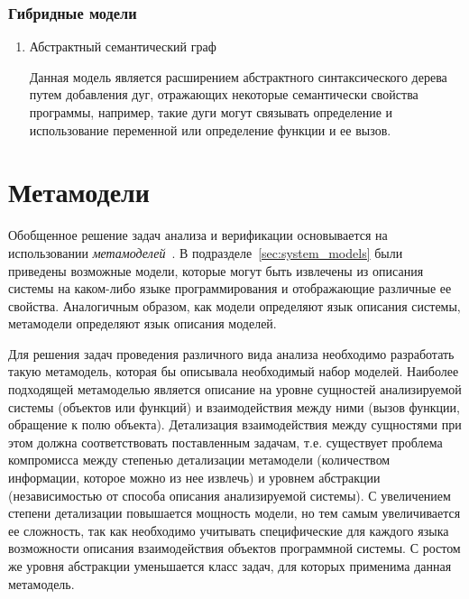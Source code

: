 \subsubsection{Гибридные модели}
\begin{enumerate}
    \item Абстрактный семантический граф

    Данная модель является расширением абстрактного синтаксического дерева путем
    добавления дуг, отражающих некоторые семантически свойства программы,
    например, такие дуги могут связывать определение и использование переменной
    или определение функции и ее вызов.
\end{enumerate}

\section{Метамодели}
\label{sec:metamodels}

Обобщенное решение задач анализа и верификации основывается на использовании
\emph{метамоделей}~\cite{metamodeling}. В подразделе~\ref{sec:system_models}
были приведены возможные модели, которые могут быть извлечены из описания
системы на каком-либо языке программирования и отображающие различные ее
свойства. Аналогичным образом, как модели определяют язык описания системы,
метамодели определяют язык описания моделей.

Для решения задач проведения различного вида анализа необходимо разработать
такую метамодель, которая бы описывала необходимый набор моделей. Наиболее
подходящей метамоделью является описание на уровне сущностей анализируемой
системы (объектов или функций) и взаимодействия между ними (вызов функции,
обращение к полю объекта). Детализация взаимодействия между сущностями при этом
должна соответствовать поставленным задачам, т.е. существует проблема
компромисса между степенью детализации метамодели (количеством информации,
которое можно из нее извлечь) и уровнем абстракции (независимостью от способа
описания анализируемой системы). С увеличением степени детализации повышается
мощность модели, но тем самым увеличивается ее сложность, так как необходимо
учитывать специфические для каждого языка возможности описания взаимодействия
объектов программной системы. С ростом же уровня абстракции уменьшается класс
задач, для которых применима данная метамодель.

